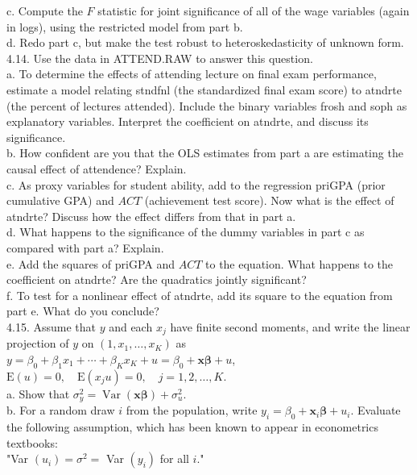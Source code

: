 \documentclass[10pt]{article}
\begin{document}
c. Compute the $F$ statistic for joint significance of all of the wage variables (again in logs), using the restricted model from part b.\\
d. Redo part c, but make the test robust to heteroskedasticity of unknown form.\\
4.14. Use the data in ATTEND.RAW to answer this question.\\
a. To determine the effects of attending lecture on final exam performance, estimate a model relating stndfnl (the standardized final exam score) to atndrte (the percent of lectures attended). Include the binary variables frosh and soph as explanatory variables. Interpret the coefficient on atndrte, and discuss its significance.\\
b. How confident are you that the OLS estimates from part a are estimating the causal effect of attendence? Explain.\\
c. As proxy variables for student ability, add to the regression priGPA (prior cumulative GPA) and $A C T$ (achievement test score). Now what is the effect of atndrte? Discuss how the effect differs from that in part a.\\
d. What happens to the significance of the dummy variables in part c as compared with part a? Explain.\\
e. Add the squares of priGPA and $A C T$ to the equation. What happens to the coefficient on atndrte? Are the quadratics jointly significant?\\
f. To test for a nonlinear effect of atndrte, add its square to the equation from part e. What do you conclude?\\
4.15. Assume that $y$ and each $x_{j}$ have finite second moments, and write the linear projection of $y$ on $\left(1, x_{1}, \ldots, x_{K}\right)$ as\\
$y=\beta_{0}+\beta_{1} x_{1}+\cdots+\beta_{K} x_{K}+u=\beta_{0}+\mathbf{x} \boldsymbol{\beta}+u$,\\
$\mathrm{E}(u)=0, \quad \mathrm{E}\left(x_{j} u\right)=0, \quad j=1,2, \ldots, K$.\\
a. Show that $\sigma_{y}^{2}=\operatorname{Var}(\mathbf{x} \boldsymbol{\beta})+\sigma_{u}^{2}$.\\
b. For a random draw $i$ from the population, write $y_{i}=\beta_{0}+\mathbf{x}_{i} \boldsymbol{\beta}+u_{i}$. Evaluate the following assumption, which has been known to appear in econometrics textbooks:\\
"Var $\left(u_{i}\right)=\sigma^{2}=$ Var $\left(y_{i}\right)$ for all $i$."\\
\end{document}
